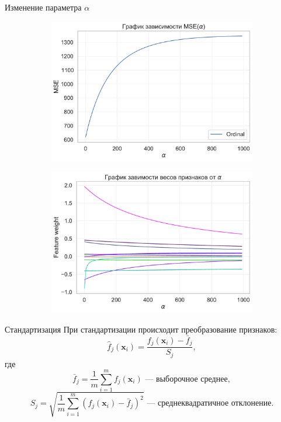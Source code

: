 \documentclass{beamer} %
\begin{document}
\begin{frame}{Изменение параметра $\alpha$}
\begin{figure}
\begin{subfigure}[b]{0.475\textwidth}
                \includegraphics[width=\textwidth]{MSE_plot.pdf}
            \end{subfigure}
            \hfill
            \begin{subfigure}[b]{0.475\textwidth}   
                \centering 
                \includegraphics[width=\textwidth]{feature_plot.pdf}
            \end{subfigure} 
        \end{figure}
    \end{frame}

    \begin{frame}{Стандартизация}
        При стандартизации происходит преобразование признаков:
        \[ \hat{f}_j(\mathbf{x}_i) = \dfrac{f_j(\mathbf{x}_i) - \bar{f}_j}{S_j}, \]
        где 
        \[ \bar{f}_j = \dfrac{1}{m} \sum\limits_{i = 1}^m f_j(\mathbf{x}_i) \text{~--- выборочное среднее}, \]
        \[ S_j = \sqrt{\dfrac{1}{m} \sum\limits_{i=1}^m (f_j(\mathbf{x}_i) - \bar{f}_j)^2} \text{~--- среднеквадратичное отклонение}. \]
    \end{frame}
\end{document}
